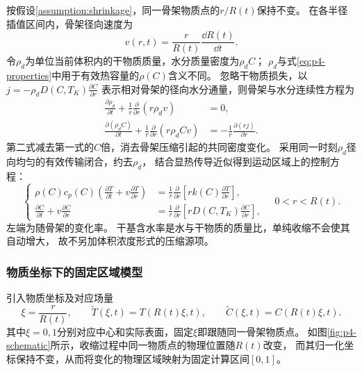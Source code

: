 按假设\ref{assumption:shrinkage}，同一骨架物质点的$r/R(t)$保持不变。
在各半径插值区间内，骨架径向速度为
\begin{equation}
  v(r,t)=\frac{r}{R(t)}\frac{\dd R(t)}{\dd t}.
  \label{eq:p4-velocity}
\end{equation}
令$\rho_d$为单位当前体积内的干物质质量，水分质量密度为$\rho_d C$；
$\rho_d$与式\eqref{eq:p4-properties}中用于有效热容量的$\rho(C)$含义不同。
忽略干物质损失，以
$j=-\rho_d D(C,T_K)\frac{\partial C}{\partial r}$
表示相对骨架的径向水分通量，则骨架与水分连续性方程为
\begin{equation}
\begin{aligned}
  \frac{\partial\rho_d}{\partial t}
    +\frac{1}{r}\frac{\partial}{\partial r}(r\rho_d v)&=0,\\
  \frac{\partial(\rho_d C)}{\partial t}
    +\frac{1}{r}\frac{\partial}{\partial r}(r\rho_d C v)
    &=-\frac{1}{r}\frac{\partial(rj)}{\partial r}.
\end{aligned}
\label{eq:p4-continuity}
\end{equation}
第二式减去第一式的$C$倍，消去骨架压缩引起的共同密度变化。
采用同一时刻$\rho_d$径向均匀的有效传输闭合，约去$\rho_d$，
结合显热传导近似得到运动区域上的控制方程：
\begin{equation}
\left\{
\begin{aligned}
  \rho(C)c_p(C)\left(\frac{\partial T}{\partial t}
    +v\frac{\partial T}{\partial r}\right)
    &=\frac{1}{r}\frac{\partial}{\partial r}
      \left[rk(C)\frac{\partial T}{\partial r}\right],\\
  \frac{\partial C}{\partial t}+v\frac{\partial C}{\partial r}
    &=\frac{1}{r}\frac{\partial}{\partial r}
      \left[rD(C,T_K)\frac{\partial C}{\partial r}\right],
\end{aligned}
\right.
\quad 0<r<R(t).
\label{eq:p4-moving-pde}
\end{equation}
左端为随骨架的变化率。
干基含水率是水与干物质的质量比，单纯收缩不会使其自动增大，
故不另加体积浓度形式的压缩源项。

\subsubsection{物质坐标下的固定区域模型}

引入物质坐标及对应场量
\[
  \xi=\frac{r}{R(t)},\qquad
  \widetilde T(\xi,t)=T(R(t)\xi,t),\qquad
  \widetilde C(\xi,t)=C(R(t)\xi,t).
\]
其中$\xi=0,1$分别对应中心和实际表面，固定$\xi$即跟随同一骨架物质点。
如图\ref{fig:p4-schematic}所示，收缩过程中同一物质点的物理位置随$R(t)$改变，
而其归一化坐标保持不变，从而将变化的物理区域映射为固定计算区间$[0,1]$。

